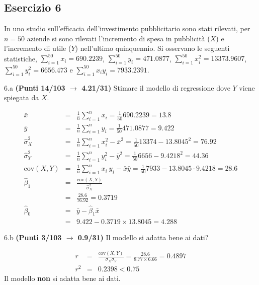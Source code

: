 \documentclass[
  11pt,
]{book}
\theoremstyle{mytheoremstyle}
\theoremstyle{mydefstyle}
\newenvironment{sol}
  {
  \begin{tcolorbox}[enhanced,breakable,arc=0.1mm,boxrule=1pt,colback=white,colframe=iblue,
  title=\bf \fontfamily{lmss}\selectfont \hspace{.5 cm} Soluzione,drop fuzzy shadow]

}{
\end{tcolorbox}
  }
\begin{document}
\subsection{Esercizio 6}\label{esercizio-6-23}

In uno studio sull'efficacia dell'investimento pubblicitario sono stati rilevati, per \(n=50\) aziende si sono rilevati l'incremento di spesa in
pubblicità (\(X\)) e l'incremento di utile (\(Y\)) nell'ultimo quinquennio. Si osservano le seguenti statistiche, \(\sum_{i=1}^{50}x_i=690.2239\), \(\sum_{i=1}^{50}y_i=471.0877\),
\(\sum_{i=1}^{50}x_i^2=13373.9607\), \(\sum_{i=1}^{50}y_i^2=6656.473\) e \(\sum_{i=1}^{50}x_iy_i=7933.2391\).

6.a \textbf{(Punti 14/103 \(\rightarrow\) 4.21/31)} Stimare il modello di regressione dove \(Y\) viene spiegata da \(X\).

\begin{sol}
\begin{eqnarray*}
           \bar x &=&\frac 1 n\sum_{i=1}^n x_i = \frac {1}{ 50 }  690.2239 =  13.8 \\
           \bar y &=&\frac 1 n\sum_{i=1}^n y_i = \frac {1}{ 50 }  471.0877 =  9.422 \\
           \hat\sigma_X^2&=&\frac 1 n\sum_{i=1}^n x_i^2-\bar x^2=\frac {1}{ 50 }  13374  - 13.8045 ^2= 76.92 \\
           \hat\sigma_Y^2&=&\frac 1 n\sum_{i=1}^n y_i^2-\bar y^2=\frac {1}{ 50 }  6656  - 9.4218 ^2= 44.36 \\
           \text{cov}(X,Y)&=&\frac 1 n\sum_{i=1}^n x_i~y_i-\bar x\bar y=\frac {1}{ 50 }  7933 - 13.8045 \cdot 9.4218 = 28.6 \\
           \hat\beta_1 &=& \frac{\text{cov}(X,Y)}{\hat\sigma_X^2} \\
                    &=& \frac{ 28.6 }{ 76.92 }  =  0.3719 \\
           \hat\beta_0 &=& \bar y - \hat\beta_1 \bar x\\
                    &=&  9.422 - 0.3719 \times  13.8045 = 4.288 
         \end{eqnarray*}

\end{sol}

6.b \textbf{(Punti 3/103 \(\rightarrow\) 0.9/31)} Il modello si adatta bene ai dati?

\begin{sol}
\begin{eqnarray*}
r&=&\frac{\text{cov}(X,Y)}{\sigma_X\sigma_Y}=\frac{ 28.6 }{ 8.77 \times 6.66 }= 0.4897 \\r^2&=& 0.2398 < 0.75
\end{eqnarray*}
Il modello \textbf{non} si adatta bene ai dati.

\end{sol}
\end{document}
